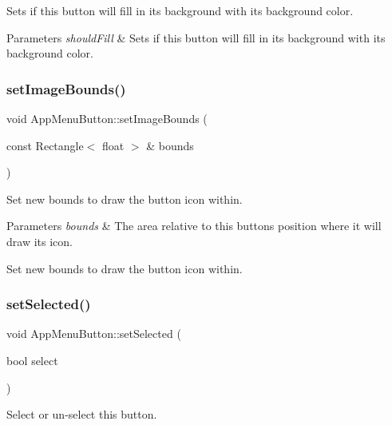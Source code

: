 Sets if this button will fill in its background with its background color.


\begin{DoxyParams}{Parameters}
{\em should\+Fill} & Sets if this button will fill in its background with its background color. \\
\hline
\end{DoxyParams}
\mbox{\label{classAppMenuButton_a1a444d9d4016f407bc021774fcd62a36}} 
\subsubsection{\texorpdfstring{set\+Image\+Bounds()}{setImageBounds()}}
{\footnotesize\ttfamily void App\+Menu\+Button\+::set\+Image\+Bounds (\begin{DoxyParamCaption}\item[{const Rectangle$<$ float $>$ \&}]{bounds }\end{DoxyParamCaption})\hspace{0.3cm}{\ttfamily [protected]}}

Set new bounds to draw the button icon within.


\begin{DoxyParams}{Parameters}
{\em bounds} & The area relative to this button\textquotesingle{}s position where it will draw its icon.\\
\hline
\end{DoxyParams}
Set new bounds to draw the button icon within. \mbox{\label{classAppMenuButton_a9cc29333d34ad085a110abd03d7ee6d9}} 
\subsubsection{\texorpdfstring{set\+Selected()}{setSelected()}}
{\footnotesize\ttfamily void App\+Menu\+Button\+::set\+Selected (\begin{DoxyParamCaption}\item[{bool}]{select }\end{DoxyParamCaption})}

Select or un-\/select this button.


